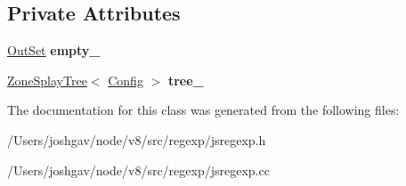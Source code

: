 \subsection*{Private Attributes}
\begin{DoxyCompactItemize}
\item 
\hyperlink{classv8_1_1internal_1_1_out_set}{Out\+Set} {\bfseries empty\+\_\+}\hypertarget{classv8_1_1internal_1_1_dispatch_table_a8d00d7ea2f2b79088840ba174396380b}{}\label{classv8_1_1internal_1_1_dispatch_table_a8d00d7ea2f2b79088840ba174396380b}

\item 
\hyperlink{classv8_1_1internal_1_1_zone_splay_tree}{Zone\+Splay\+Tree}$<$ \hyperlink{classv8_1_1internal_1_1_dispatch_table_1_1_config}{Config} $>$ {\bfseries tree\+\_\+}\hypertarget{classv8_1_1internal_1_1_dispatch_table_af90098ba8ea3230406349012cb1c3dc5}{}\label{classv8_1_1internal_1_1_dispatch_table_af90098ba8ea3230406349012cb1c3dc5}

\end{DoxyCompactItemize}


The documentation for this class was generated from the following files\+:\begin{DoxyCompactItemize}
\item 
/\+Users/joshgav/node/v8/src/regexp/jsregexp.\+h\item 
/\+Users/joshgav/node/v8/src/regexp/jsregexp.\+cc\end{DoxyCompactItemize}
